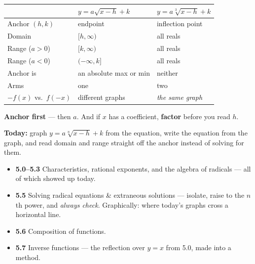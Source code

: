 \documentclass[aspectratio=169, 11pt]{beamer}
\begin{document}
\begin{frame}[t, plain]
  \begin{center}
  \renewcommand{\arraystretch}{1.35}
  \begin{tabular}{lll}
  \hline
   & \textbf{$y=a\sqrt{x-h}+k$} & \textbf{$y=a\sqrt[3]{x-h}+k$} \\
  \hline
  Anchor $(h,k)$ & endpoint & inflection point \\
  Domain & $[h,\infty)$ & all reals \\
  Range ($a>0$) & $[k,\infty)$ & all reals \\
  Range ($a<0$) & $(-\infty,k]$ & all reals \\
  Anchor is & an absolute max or min & neither \\
  Arms & one & two \\
  $-f(x)$ vs.\ $f(-x)$ & different graphs & \emph{the same graph} \\
  \hline
  \end{tabular}
  \end{center}
  \vspace{4pt}
  \begin{center}
    \textbf{Anchor first} --- then $a$. And if $x$ has a coefficient, \textbf{factor} before you read
    $h$.
  \end{center}
\end{frame}

\begin{frame}[t, plain]
  \textbf{Today:} graph $y=a\sqrt[n]{x-h}+k$ from the equation, write the equation from the graph, and
  read domain and range straight off the anchor instead of solving for them.\\[8pt]
  \begin{itemize}\setlength{\itemsep}{3pt}
    \item \textbf{5.0--5.3} Characteristics, rational exponents, and the algebra of radicals --- all of
          which showed up today.
    \item \textbf{5.5} Solving radical equations \& extraneous solutions --- isolate, raise to the
          $n$th power, and \emph{always check}. Graphically: where today's graphs cross a horizontal
          line.
    \item \textbf{5.6} Composition of functions.
    \item \textbf{5.7} Inverse functions --- the reflection over $y=x$ from 5.0, made into a method.
  \end{itemize}
\end{frame}
\end{document}
